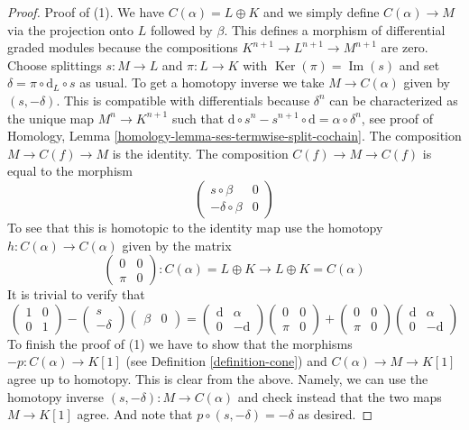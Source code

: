 \documentclass{stacks-project}
\theoremstyle{plain}
\theoremstyle{definition}
\theoremstyle{remark}
\numberwithin{equation}{subsection}
\def\Ker{\mathop{\mathrm{Ker}}}
\def\Im{\mathop{\mathrm{Im}}}
\begin{document}
\begin{proof}
Proof of (1). We have $C(\alpha) = L \oplus K$ and we simply define
$C(\alpha) \to M$ via the projection onto $L$ followed by $\beta$.
This defines a morphism of differential graded modules because the
compositions $K^{n + 1} \to L^{n + 1} \to M^{n + 1}$ are zero.
Choose splittings $s : M \to L$ and $\pi : L \to K$ with
$\Ker(\pi) = \Im(s)$ and set
$\delta = \pi \circ \text{d}_L \circ s$ as usual.
To get a homotopy inverse we take
$M \to C(\alpha)$ given by $(s , -\delta)$. This is compatible with
differentials because $\delta^n$ can be characterized as the
unique map $M^n \to K^{n + 1}$ such that
$\text{d} \circ s^n - s^{n + 1} \circ \text{d} = \alpha \circ \delta^n$,
see proof of
Homology, Lemma \ref{homology-lemma-ses-termwise-split-cochain}.
The composition $M \to C(f) \to M$ is the identity.
The composition $C(f) \to M \to C(f)$ is equal to the morphism
$$
\left(
\begin{matrix}
s \circ \beta & 0 \\
-\delta \circ \beta & 0
\end{matrix}
\right)
$$
To see that this is homotopic to the identity map
use the homotopy $h : C(\alpha) \to C(\alpha)$
given by the matrix
$$
\left(
\begin{matrix}
0 & 0 \\
\pi & 0
\end{matrix}
\right) :
C(\alpha) = L \oplus K
\to
L \oplus K = C(\alpha)
$$
It is trivial to verify that
$$
\left(
\begin{matrix}
1 & 0 \\
0 & 1
\end{matrix}
\right)
-
\left(
\begin{matrix}
s \\
-\delta
\end{matrix}
\right)
\left(
\begin{matrix}
\beta & 0
\end{matrix}
\right)
=
\left(
\begin{matrix}
\text{d} & \alpha \\
0 & -\text{d}
\end{matrix}
\right)
\left(
\begin{matrix}
0 & 0 \\
\pi & 0
\end{matrix}
\right)
+
\left(
\begin{matrix}
0 & 0 \\
\pi & 0
\end{matrix}
\right)
\left(
\begin{matrix}
\text{d} & \alpha \\
0 & -\text{d}
\end{matrix}
\right)
$$
To finish the proof of (1) we have to show that the morphisms
$-p : C(\alpha) \to K[1]$ (see
Definition \ref{definition-cone})
and $C(\alpha) \to M \to K[1]$ agree up
to homotopy. This is clear from the above. Namely, we can use the homotopy
inverse $(s, -\delta) : M \to C(\alpha)$
and check instead that the two maps
$M \to K[1]$ agree. And note that
$p \circ (s, -\delta) = -\delta$ as desired.


\end{proof}
\end{document}
